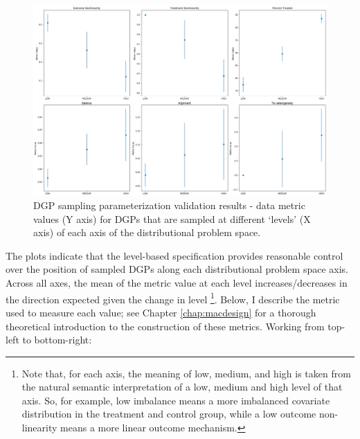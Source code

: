 \documentclass[../main.tex]{subfiles}
\begin{document}
\begin{figure}[ht!]
    \centering
    \includegraphics[width=1\linewidth]{figures/ch7-sampling-validation-1.png}
    \caption{DGP sampling parameterization validation results - data metric values (Y axis) for DGPs that are sampled at different `levels' (X axis) of each axis of the distributional problem space.}
    \label{fig:sampling-validation-results-1}
\end{figure}

The plots indicate that the level-based specification provides reasonable control over the position of sampled DGPs along each distributional problem space axis. Across all axes, the mean of the metric value at each level increases/decreases in the direction expected given the change in level \footnote{Note that, for each axis, the meaning of low, medium, and high is taken from the natural semantic interpretation of a low, medium and high level of that axis. So, for example, low imbalance means a more imbalanced covariate distribution in the treatment and control group, while a low outcome non-linearity means a more linear outcome mechanism.}. Below, I describe the metric used to measure each value; see Chapter \ref{chap:macdesign} for a thorough theoretical introduction to the construction of these metrics. Working from top-left to bottom-right:
\end{document}
